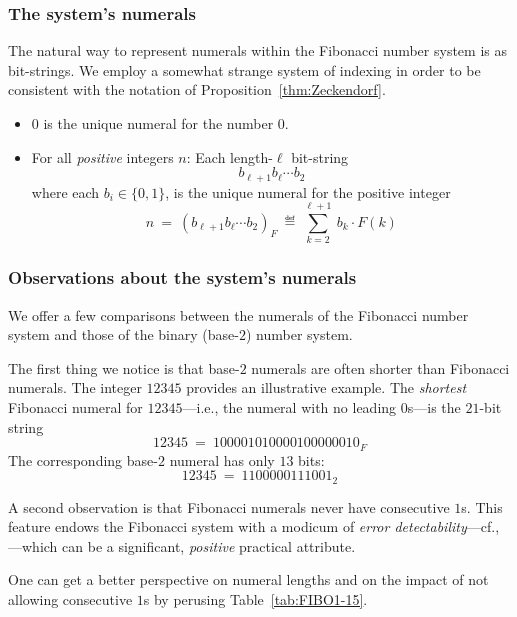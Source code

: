 
\subsubsection{The system's numerals}

The natural way to represent numerals within the Fibonacci number system is as bit-strings.  We employ a somewhat strange system of indexing in order to be consistent with the notation of Proposition~\ref{thm:Zeckendorf}.
\begin{itemize}
\item
$0$ is the unique numeral for the number $0$.
\item
For all {\em positive} integers $n$: Each length-$\ell$ bit-string
\[ b_{\ell+1} b_{\ell} \cdots b_2 \]
where each $b_i \in \{0,1\}$, is the unique numeral for the positive integer
\[ n \ = \ (b_{\ell+1} b_\ell \cdots b_2)_F \ \eqdef \  \sum_{k=2}^{\ell+1} \ b_k \cdot F(k) \]
\end{itemize}


\subsubsection{Observations about the system's numerals}

We offer a few comparisons between the numerals of the Fibonacci number system and those of the binary (base-$2$) number system.

\smallskip

The first thing we notice is that base-$2$ numerals are often shorter than Fibonacci numerals. The integer $12345$ provides an illustrative example.  The {\em shortest} Fibonacci numeral for $12345$---i.e., the numeral with no leading $0$s---is the $21$-bit string
\[ 12345 \ = \ 1 00001 01000 01000 00010_F \]
The corresponding base-$2$ numeral has only $13$ bits:
\[ 12345 \ = \ 110 00001 11001_2 \]

\medskip

A second observation is that Fibonacci numerals never have consecutive $1$s.  This feature endows the Fibonacci system with a modicum of {\em error detectability}---cf., \cite{PetersonW81}---which can be a significant, {\em positive} practical attribute.


\medskip

One can get a better perspective on numeral lengths and on the impact of not allowing consecutive $1$s by perusing Table~\ref{tab:FIBO1-15}.

